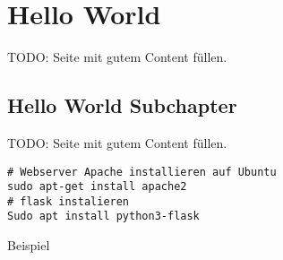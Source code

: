 \section{Hello World}

TODO: Seite mit gutem Content füllen.

\subsection{Hello World Subchapter}

TODO: Seite mit gutem Content füllen.

\begin{verbatim}
# Webserver Apache installieren auf Ubuntu
sudo apt-get install apache2
# flask instalieren
Sudo apt install python3-flask

\end{verbatim}

\begin{listing}[ht]{}
    \caption{Beispiel}
    \label{listing:Beispiel}
\end{listing}
